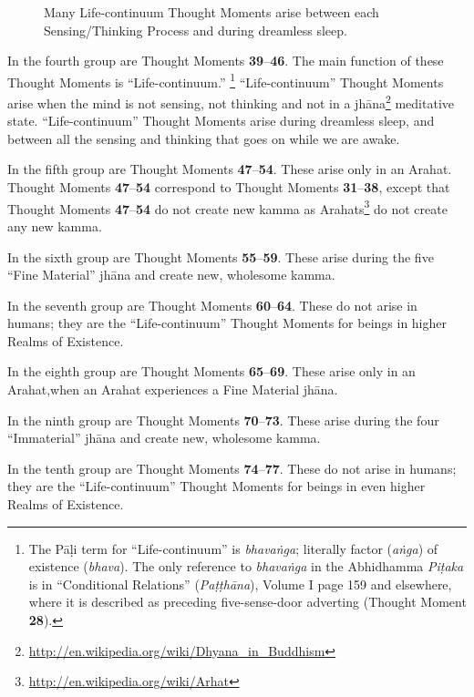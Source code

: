 \begin{figure}[h]
\centering

\caption{Many Life-continuum Thought Moments arise between each Sensing/Thinking Process and during dreamless sleep.}
\label{fig:Life_Cont}
\end{figure}

In the fourth group are Thought Moments \textbf{39}--\textbf{46}. The main function of these Thought Moments is “Life-continuum.” \footnote{The Pāḷi term for “Life-continuum” is \textit{bhavaṅga}; literally factor (\textit{aṅga}) of existence (\textit{bhava}). The only reference to \textit{bhavaṅga} in the Abhidhamma \textit{Piṭaka} is in “Conditional Relations” (\textit{Paṭṭhāna}), Volume I page 159 and elsewhere, where it is described as preceding five-sense-door adverting (Thought Moment \textbf{28}).} “Life-continuum” Thought Moments arise when the mind is not sensing, not thinking and not in a jhāna\footnote{\url{http://en.wikipedia.org/wiki/Dhyana_in_Buddhism}} meditative state. “Life-continuum” Thought Moments arise during dreamless sleep, and between all the sensing and thinking that goes on while we are awake.

In the fifth group are Thought Moments \textbf{47}--\textbf{54}. These arise only in an Arahat. Thought Moments \textbf{47}--\textbf{54} correspond to Thought Moments \textbf{31}--\textbf{38}, except that Thought Moments \textbf{47}--\textbf{54} do not create new kamma as Arahats\footnote{\url{http://en.wikipedia.org/wiki/Arhat}} do not create any new kamma.

In the sixth group are Thought Moments \textbf{55}--\textbf{59}. These arise during the five “Fine Material” jhāna and create new, wholesome kamma.

In the seventh group are Thought Moments \textbf{60}--\textbf{64}. These do not arise in humans; they are the “Life-continuum” Thought Moments for beings in higher Realms of Existence.

In the eighth group are Thought Moments \textbf{65}--\textbf{69}. These arise only in an Arahat,when an Arahat experiences a Fine Material jhāna.

In the ninth group are Thought Moments \textbf{70}--\textbf{73}. These arise during the four “Immaterial” jhāna and create new, wholesome kamma.

In the tenth group are Thought Moments \textbf{74}--\textbf{77}. These do not arise in humans; they are the “Life-continuum” Thought Moments for beings in even higher Realms of Existence.


